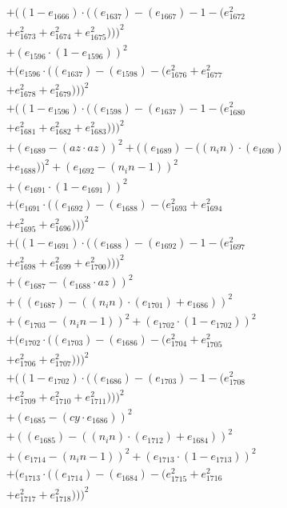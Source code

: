\documentclass[10pt, a4paper]{article}
\begin{document}
\begin{align*}
& + ((1 - e_{1666})  \cdot  ((e_{1637}) - (e_{1667}) - 1 - (e_{1672}^{2} \\
& + e_{1673}^{2} + e_{1674}^{2} + e_{1675}^{2})))^{2} \\
& + (e_{1596}  \cdot  (1 - e_{1596}))^{2} \\
& + (e_{1596}  \cdot  ((e_{1637}) - (e_{1598}) - (e_{1676}^{2} + e_{1677}^{2} \\
& + e_{1678}^{2} + e_{1679}^{2})))^{2} \\
& + ((1 - e_{1596})  \cdot  ((e_{1598}) - (e_{1637}) - 1 - (e_{1680}^{2} \\
& + e_{1681}^{2} + e_{1682}^{2} + e_{1683}^{2})))^{2} \\
& + (e_{1689} - (az  \cdot  az))^{2} + ((e_{1689}) - ((n_in)  \cdot  (e_{1690}) \\
& + e_{1688}))^{2} + (e_{1692} - (n_in - 1))^{2} \\
& + (e_{1691}  \cdot  (1 - e_{1691}))^{2} \\
& + (e_{1691}  \cdot  ((e_{1692}) - (e_{1688}) - (e_{1693}^{2} + e_{1694}^{2} \\
& + e_{1695}^{2} + e_{1696}^{2})))^{2} \\
& + ((1 - e_{1691})  \cdot  ((e_{1688}) - (e_{1692}) - 1 - (e_{1697}^{2} \\
& + e_{1698}^{2} + e_{1699}^{2} + e_{1700}^{2})))^{2} \\
& + (e_{1687} - (e_{1688}  \cdot  az))^{2} \\
& + ((e_{1687}) - ((n_in)  \cdot  (e_{1701}) + e_{1686}))^{2} \\
& + (e_{1703} - (n_in - 1))^{2} + (e_{1702}  \cdot  (1 - e_{1702}))^{2} \\
& + (e_{1702}  \cdot  ((e_{1703}) - (e_{1686}) - (e_{1704}^{2} + e_{1705}^{2} \\
& + e_{1706}^{2} + e_{1707}^{2})))^{2} \\
& + ((1 - e_{1702})  \cdot  ((e_{1686}) - (e_{1703}) - 1 - (e_{1708}^{2} \\
& + e_{1709}^{2} + e_{1710}^{2} + e_{1711}^{2})))^{2} \\
& + (e_{1685} - (cy  \cdot  e_{1686}))^{2} \\
& + ((e_{1685}) - ((n_in)  \cdot  (e_{1712}) + e_{1684}))^{2} \\
& + (e_{1714} - (n_in - 1))^{2} + (e_{1713}  \cdot  (1 - e_{1713}))^{2} \\
& + (e_{1713}  \cdot  ((e_{1714}) - (e_{1684}) - (e_{1715}^{2} + e_{1716}^{2} \\
& + e_{1717}^{2} + e_{1718}^{2})))^{2} \\

\end{align*}
\end{document}
